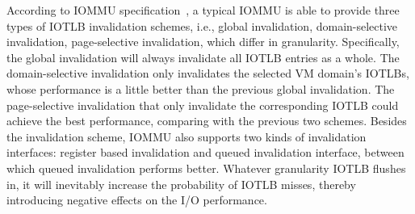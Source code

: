 According to IOMMU specification~\cite{intelvt}, a typical IOMMU is able to provide three types of IOTLB invalidation schemes, i.e., global invalidation, domain-selective invalidation, page-selective invalidation, which differ in granularity.
Specifically, the global invalidation will always invalidate all IOTLB entries as a whole.
The domain-selective invalidation only invalidates the selected VM domain's IOTLBs, whose performance is a little better than the previous global invalidation.
The page-selective invalidation that only invalidate the corresponding IOTLB could achieve the best performance, comparing with the previous two schemes.
Besides the invalidation scheme, IOMMU also supports two kinds of invalidation interfaces: register based invalidation and queued invalidation interface, between which queued invalidation performs better.
Whatever granularity IOTLB flushes in, it will inevitably increase the probability of IOTLB misses, thereby introducing negative effects on the I/O performance.

